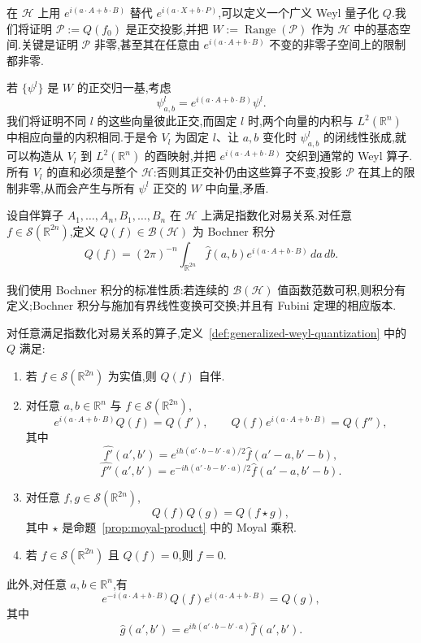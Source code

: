 {在 $\mathcal H$ 上用 $e^{i(a\cdot A+b\cdot B)}$ 替代 $e^{i(a\cdot X+b\cdot P)}$,可以定义一个广义 Weyl 量子化 $Q$.我们将证明 $\mathcal P:=Q(f_0)$ 是正交投影,并把 $W:=\operatorname{Range}(\mathcal P)$ 作为 $\mathcal H$ 中的基态空间.关键是证明 $\mathcal P$ 非零,甚至其在任意由 $e^{i(a\cdot A+b\cdot B)}$ 不变的非零子空间上的限制都非零.

若 $\{\psi^l\}$ 是 $W$ 的正交归一基,考虑
\[
\psi^l_{a,b}=e^{i(a\cdot A+b\cdot B)}\psi^l.
\]
我们将证明不同 $l$ 的这些向量彼此正交,而固定 $l$ 时,两个向量的内积与 $L^2(\mathbb R^n)$ 中相应向量的内积相同.于是令 $V_l$ 为固定 $l$、让 $a,b$ 变化时 $\psi^l_{a,b}$ 的闭线性张成,就可以构造从 $V_l$ 到 $L^2(\mathbb R^n)$ 的酉映射,并把 $e^{i(a\cdot A+b\cdot B)}$ 交织到通常的 Weyl 算子.所有 $V_l$ 的直和必须是整个 $\mathcal H$:否则其正交补仍由这些算子不变,投影 $\mathcal P$ 在其上的限制非零,从而会产生与所有 $\psi^l$ 正交的 $W$ 中向量,矛盾.

\begin{definition}\label{def:generalized-weyl-quantization}
设自伴算子 $A_1,\ldots,A_n,B_1,\ldots,B_n$ 在 $\mathcal H$ 上满足指数化对易关系.对任意 $f\in\mathcal S(\mathbb R^{2n})$,定义 $Q(f)\in\mathcal B(\mathcal H)$ 为 Bochner 积分
\[
Q(f)=(2\pi)^{-n}\int_{\mathbb R^{2n}}\widehat f(a,b)e^{i(a\cdot A+b\cdot B)}\,da\,db.
\label{eq:generalized-weyl}
\]
\end{definition}

我们使用 Bochner 积分的标准性质:若连续的 $\mathcal B(\mathcal H)$ 值函数范数可积,则积分有定义;Bochner 积分与施加有界线性变换可交换;并且有 Fubini 定理的相应版本.

\begin{proposition}\label{prop:generalized-weyl-properties}
对任意满足指数化对易关系的算子,定义~\ref{def:generalized-weyl-quantization} 中的 $Q$ 满足:
\begin{enumerate}
\item 若 $f\in\mathcal S(\mathbb R^{2n})$ 为实值,则 $Q(f)$ 自伴.
\item 对任意 $a,b\in\mathbb R^n$ 与 $f\in\mathcal S(\mathbb R^{2n})$,
\[
e^{i(a\cdot A+b\cdot B)}Q(f)=Q(f'),
\qquad
Q(f)e^{i(a\cdot A+b\cdot B)}=Q(f''),
\]
其中
\[
\widehat{f'}(a',b')=e^{i\hbar(a'\cdot b-b'\cdot a)/2}\widehat f(a'-a,b'-b),
\]
\[
\widehat{f''}(a',b')=e^{-i\hbar(a'\cdot b-b'\cdot a)/2}\widehat f(a'-a,b'-b).
\]
\item 对任意 $f,g\in\mathcal S(\mathbb R^{2n})$,
\[
Q(f)Q(g)=Q(f\star g),
\]
其中 $\star$ 是命题~\ref{prop:moyal-product} 中的 Moyal 乘积.
\item 若 $f\in\mathcal S(\mathbb R^{2n})$ 且 $Q(f)=0$,则 $f=0$.
\end{enumerate}
此外,对任意 $a,b\in\mathbb R^n$,有
\[
e^{-i(a\cdot A+b\cdot B)}Q(f)e^{i(a\cdot A+b\cdot B)}=Q(g),
\]
其中
\[
\widehat g(a',b')=e^{i\hbar(a'\cdot b-b'\cdot a)}\widehat f(a',b').
\label{eq:generalized-weyl-conjugation}
\]
\end{proposition}

}
